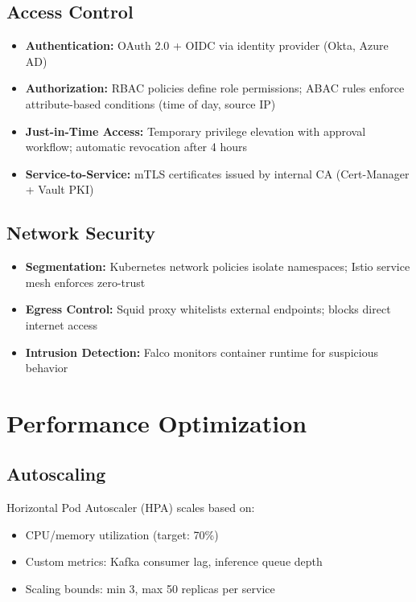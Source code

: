 \subsection{Access Control}
\begin{itemize}
    \item \textbf{Authentication:} OAuth 2.0 + OIDC via identity provider (Okta, Azure AD)
    \item \textbf{Authorization:} RBAC policies define role permissions; ABAC rules enforce attribute-based conditions (time of day, source IP)
    \item \textbf{Just-in-Time Access:} Temporary privilege elevation with approval workflow; automatic revocation after 4 hours
    \item \textbf{Service-to-Service:} mTLS certificates issued by internal CA (Cert-Manager + Vault PKI)
\end{itemize}

\subsection{Network Security}
\begin{itemize}
    \item \textbf{Segmentation:} Kubernetes network policies isolate namespaces; Istio service mesh enforces zero-trust
    \item \textbf{Egress Control:} Squid proxy whitelists external endpoints; blocks direct internet access
    \item \textbf{Intrusion Detection:} Falco monitors container runtime for suspicious behavior
\end{itemize}

\section{Performance Optimization}\label{sec:arch-performance}
\subsection{Autoscaling}
Horizontal Pod Autoscaler (HPA) scales based on:
\begin{itemize}
    \item CPU/memory utilization (target: 70\%)
    \item Custom metrics: Kafka consumer lag, inference queue depth
    \item Scaling bounds: min 3, max 50 replicas per service
\end{itemize}

